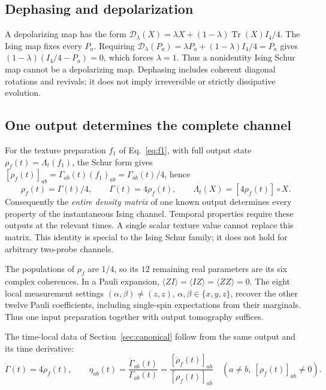 \documentclass[11pt,a4paper]{article}
\newcommand{\Tr}{\operatorname{Tr}}
\begin{document}
\subsection{Dephasing and depolarization}\label{sec:depolarizing}

A depolarizing map has the form
$\mathcal D_\lambda(X)=\lambda X+(1-\lambda)\Tr(X)I_4/4$.
The Ising map fixes every $P_a$. Requiring
$\mathcal D_\lambda(P_a)=\lambda P_a+(1-\lambda)I_4/4=P_a$ gives
$(1-\lambda)(I_4/4-P_a)=0$, which forces $\lambda=1$.
Thus a nonidentity Ising Schur map cannot be a depolarizing map.
Dephasing includes coherent diagonal rotations and revivals; it does
not imply irreversible or strictly dissipative evolution.

\subsection{One output determines the complete channel}
\label{sec:oneinput}

For the texture preparation $f_1$ of Eq.~\eqref{eq:f1}, with full
output state $\rho_f(t)=\Lambda_t(f_1)$, the Schur form gives
$[\rho_f(t)]_{ab}=\Gamma_{ab}(t)(f_1)_{ab}=\Gamma_{ab}(t)/4$, hence
\begin{equation}
 \boxed{\rho_f(t)=\Gamma(t)/4,\qquad
 \Gamma(t)=4\rho_f(t),\qquad
 \Lambda_t(X)=[4\rho_f(t)]\circ X.}
 \label{eq:reconstruction}
\end{equation}
Consequently the \emph{entire density matrix} of one known output
determines every property of the instantaneous Ising channel. Temporal
properties require these outputs at the relevant times. A single scalar
texture value cannot replace this matrix. This identity is special to
the Ising Schur family; it does not hold for arbitrary two-probe channels.

The populations of $\rho_f$ are $1/4$, so its $12$ remaining real
parameters are its six complex coherences. In a Pauli expansion,
$\langle ZI\rangle=\langle IZ\rangle=\langle ZZ\rangle=0$.
The eight local measurement settings $(\alpha,\beta)\ne(z,z)$,
$\alpha,\beta\in\{x,y,z\}$, recover the other twelve Pauli coefficients,
including single-spin expectations from their marginals. Thus one
input preparation together with output tomography suffices.

The time-local data of Section~\ref{sec:canonical} follow from the same
output and its time derivative:
\begin{equation}
 \dot\Gamma(t)=4\dot\rho_f(t),\qquad
 \eta_{ab}(t)=\frac{\dot\Gamma_{ab}(t)}{\Gamma_{ab}(t)}
 =\frac{[\dot\rho_f(t)]_{ab}}{[\rho_f(t)]_{ab}}
 \quad(a\ne b,\ [\rho_f(t)]_{ab}\ne0).
 \label{eq:etafromrho}
\end{equation}
\end{document}

